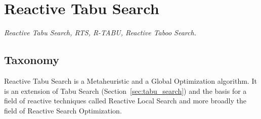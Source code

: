 

\section{Reactive Tabu Search} 
\label{sec:reactive_tabu_search}

\emph{Reactive Tabu Search, RTS, R-TABU, Reactive Taboo Search.}

\subsection{Taxonomy}
Reactive Tabu Search is a Metaheuristic and a Global Optimization algorithm.
It is an extension of Tabu Search (Section~\ref{sec:tabu_search}) and the basis for a field of reactive techniques called Reactive Local Search and more broadly the field of Reactive Search Optimization.

